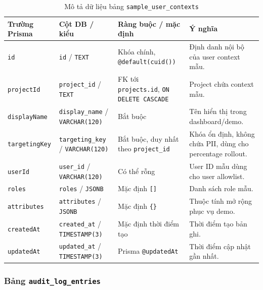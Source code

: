 \begin{table}[H]
    \centering
    \caption{Mô tả dữ liệu bảng \texttt{sample\_user\_contexts}}
    \label{tab:db-sample-user-contexts}
    \begingroup
    \singlespacing
    \scriptsize
    \setlength{\tabcolsep}{3pt}
    \renewcommand{\arraystretch}{1.12}
    \begin{tabular}{p{} p{} p{} p{}}
        \toprule
        \textbf{Trường Prisma} & \textbf{Cột DB / kiểu} & \textbf{Ràng buộc / mặc định} & \textbf{Ý nghĩa} \\
        \midrule
        \texttt{id} & \texttt{id} / \texttt{TEXT} & Khóa chính, \texttt{@default(cuid())} & Định danh nội bộ của user context mẫu. \\
        \texttt{projectId} & \texttt{project\_id} / \texttt{TEXT} & FK tới \texttt{projects.id}, \texttt{ON DELETE CASCADE} & Project chứa context mẫu. \\
        \texttt{displayName} & \texttt{display\_name} / \texttt{VARCHAR(120)} & Bắt buộc & Tên hiển thị trong dashboard/demo. \\
        \texttt{targetingKey} & \texttt{targeting\_key} / \texttt{VARCHAR(120)} & Bắt buộc, duy nhất theo \texttt{project\_id} & Khóa ổn định, không chứa PII, dùng cho percentage rollout. \\
        \texttt{userId} & \texttt{user\_id} / \texttt{VARCHAR(120)} & Có thể rỗng & User ID mẫu dùng cho user allowlist. \\
        \texttt{roles} & \texttt{roles} / \texttt{JSONB} & Mặc định \texttt{[]} & Danh sách role mẫu. \\
        \texttt{attributes} & \texttt{attributes} / \texttt{JSONB} & Mặc định \texttt{\{\}} & Thuộc tính mở rộng phục vụ demo. \\
        \texttt{createdAt} & \texttt{created\_at} / \texttt{TIMESTAMP(3)} & Mặc định thời điểm tạo & Thời điểm tạo bản ghi. \\
        \texttt{updatedAt} & \texttt{updated\_at} / \texttt{TIMESTAMP(3)} & Prisma \texttt{@updatedAt} & Thời điểm cập nhật gần nhất. \\
        \bottomrule
    \end{tabular}
    \endgroup
\end{table}

\subsubsection{Bảng \texttt{audit\_log\_entries}}

